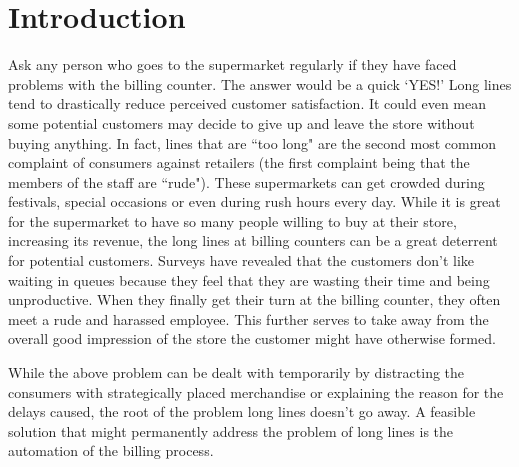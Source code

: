 \documentclass[times, 1pt, a4paper]{article}
\begin{document}
\thispagestyle{empty}
\newpage

\thispagestyle{empty}
\newpage


\thispagestyle{empty}
\newpage


\thispagestyle{empty}
\newpage


\thispagestyle{empty}
\newpage

\newpage
\tableofcontents
\thispagestyle{empty}

\newpage
\listoffigures
\thispagestyle{empty}

\newpage
\listoftables
\thispagestyle{empty}

\newpage

\setcounter{page}{1} 

\graphicspath{{figures/}} %

\section{Introduction}\label{section:intro}

Ask any person who goes to the supermarket regularly if they have faced problems with the billing counter. The answer would be a quick `YES!' Long lines tend to drastically reduce perceived customer satisfaction. It could even mean some potential customers may decide to give up and leave the store without buying anything. In fact, lines that are ``too long" are the second most common complaint of consumers against retailers (the first complaint being that the members of the staff are ``rude"). These supermarkets can get crowded during festivals, special occasions or even during rush hours every day. While it is great for the supermarket to have so many people willing to buy at their store, increasing its revenue, the long lines at billing counters can be a great deterrent for potential customers. Surveys have revealed that the customers don't like waiting in queues because they feel that they are wasting their time and being unproductive. When they finally get their turn at the billing counter, they often meet a rude and harassed employee. This further serves to take away from the overall good impression of the store the customer might have otherwise formed.

While the above problem can be dealt with temporarily by distracting the consumers with strategically placed merchandise or explaining the reason for the delays caused, the root of the problem  long lines doesn’t go away. A feasible solution that might permanently address the problem of long lines is the automation of the billing process.
\end{document}
